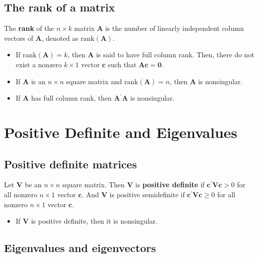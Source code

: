 \documentclass[a4paper,11pt]{article}
\begin{document}
\subsection{The rank of a matrix}
\label{sec:org03806a8}

The \textbf{rank} of the \(n \times k\) matrix \(\mathbf{A}\) is the number of
linearly independent column vectors of \(\mathbf{A}\), denoted as
\(\mathrm{rank}(\mathbf{A})\). 
\begin{itemize}
\item If \(\mathrm{rank}(\mathbf{A}) = k\), then \(\mathbf{A}\) is said to
have full column rank. Then, there do not exist a nonzero \(k \times
  1\) vector \(\mathbf{c}\) such that \(\mathbf{A} \mathbf{c} =
  \mathbf{0}\).
\item If \(\mathbf{A}\) is an \(n \times n\) square matrix and
\(\mathrm{rank}(\mathbf{A}) = n\), then \(\mathbf{A}\) is nonsingular.
\item If \(\mathbf{A}\) has full column rank, then \(\mathbf{A}^{\prime}
  \mathbf{A}\) is nonsingular.
\end{itemize}


\section{Positive Definite and Eigenvalues}
\label{sec:orgb17665b}

\subsection{Positive definite matrices}
\label{sec:orgf68beb3}

Let \(\mathbf{V}\) be an \(n \times n\) square matrix. Then \(\mathbf{V}\)
is \textbf{positive definite} if 
\(\mathbf{c}^{\prime} \mathbf{V} \mathbf{c} > 0\) 
for all nonzero \(n \times 1\) vector \(\mathbf{c}\). And \(\mathbf{V}\)
is positive semidefinite if 
\(\mathbf{c}^{\prime} \mathbf{V} \mathbf{c} \geq 0\) for all nonzero 
\(n \times 1\) vector \(\mathbf{c}\).

\begin{itemize}
\item If \(\mathbf{V}\) is positive definite, then it is nonsingular.
\end{itemize}

\subsection{Eigenvalues and eigenvectors}
\label{sec:orgf982349}
\end{document}
